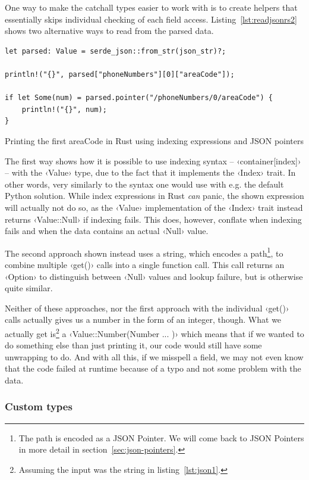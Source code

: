One way to make the catchall types easier to work with is to create helpers that essentially skips individual checking of each field access. Listing~\ref{lst:readjsonrs2} shows two alternative ways to read from the parsed data.

\begin{listing}[ht!]
\begin{verbatim}
let parsed: Value = serde_json::from_str(json_str)?;

println!("{}", parsed["phoneNumbers"][0]["areaCode"]);

if let Some(num) = parsed.pointer("/phoneNumbers/0/areaCode") {
    println!("{}", num);
}
\end{verbatim}
\caption{Printing the first areaCode in Rust using indexing expressions and JSON pointers}
\label{lst:readjsonrs2}
\end{listing}

The first way shows how it is possible to use indexing syntax -- ‹container[index]› -- with the ‹Value› type, due to the fact that it implements the ‹Index› trait. In other words, very similarly to the syntax one would use with e.g. the default Python solution. While index expressions in Rust \emph{can} panic, the shown expression will actually not do so, as the ‹Value› implementation of the ‹Index› trait instead returns ‹Value::Null› if indexing fails. This does, however, conflate when indexing fails and when the data contains an actual ‹Null› value.

The second approach shown instead uses a string, which encodes a path\footnote{The path is encoded as a JSON Pointer. We will come back to JSON Pointers in more detail in section~\ref{sec:json-pointers}.}, to combine multiple ‹get()› calls into a single function call. This call returns an ‹Option› to distinguish between ‹Null› values and lookup failure, but is otherwise quite similar.

Neither of these approaches, nor the first approach with the individual ‹get()› calls actually gives us a number in the form of an integer, though. What we actually get is\footnote{Assuming the input was the string in listing~\ref{lst:json1}.} a ‹Value::Number(Number { ... })› which means that if we wanted to do something else than just printing it, our code would still have some unwrapping to do. And with all this, if we misspell a field, we may not even know that the code failed at runtime because of a typo and not some problem with the data.

\subsubsection{Custom types}

